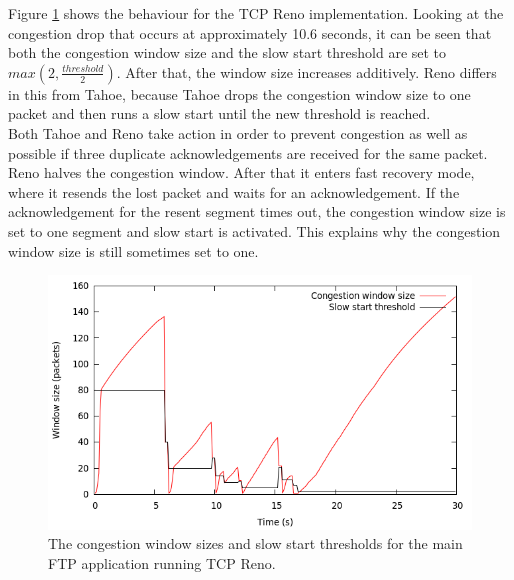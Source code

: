 \begin{enumerate}
 Figure \ref{fig:ex2congestionwindowreno} shows the behaviour for the TCP Reno implementation. Looking at the congestion drop
 that occurs at approximately 10.6 seconds, it can be seen that both the congestion window size and the slow start threshold
 are set to $max(2, \frac{threshold}{2})$. After that, the window size increases additively. Reno differs in this from
 Tahoe, because Tahoe drops the congestion window size to one packet and then runs a slow start until the new threshold
 is reached. \\
 
 Both Tahoe and Reno take action in order to prevent congestion as well as possible if three duplicate acknowledgements are
 received for the same packet. Reno halves the congestion window. After that it enters fast recovery mode, where it
 resends the lost packet and waits for an acknowledgement. If the acknowledgement for
 the resent segment times out, the congestion window size is set to one segment and slow start is activated. This explains
 why the congestion window size is still sometimes set to one.
 
 \begin{figure}[h]
 \label{fig:ex2congestionwindowreno}
  \centering
    \includegraphics[scale=0.5]{ex2congestionwindowreno.png}
  \caption{The congestion window sizes and slow start thresholds for the main FTP application running TCP Reno.}
 \end{figure}
 
 
\end{enumerate}